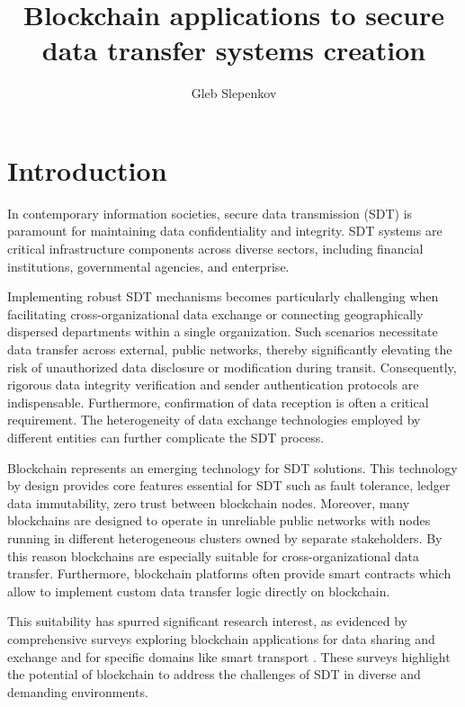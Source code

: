 \documentclass[10pt]{llncs}
\begin{document}
\title{Blockchain applications to secure data transfer systems creation}
\author{Gleb Slepenkov}

\maketitle

\section{Introduction}

In contemporary information societies, secure data transmission (SDT) is paramount for maintaining data confidentiality and integrity. 
SDT systems are critical infrastructure components across diverse sectors, including financial institutions, governmental agencies, and enterprise.

Implementing robust SDT mechanisms becomes particularly challenging when facilitating cross-organizational data exchange or connecting geographically dispersed departments within a single organization. 
Such scenarios necessitate data transfer across external, public networks, thereby significantly elevating the risk of unauthorized data disclosure or modification during transit. 
Consequently, rigorous data integrity verification and sender authentication protocols are indispensable. 
Furthermore, confirmation of data reception is often a critical requirement. 
The heterogeneity of data exchange technologies employed by different entities can further complicate the SDT process.

Blockchain represents an emerging technology for SDT solutions. 
This technology by design provides core features essential for SDT such as fault tolerance, ledger data immutability, zero trust between blockchain nodes.
Moreover, many blockchains are designed to operate in unreliable public networks with nodes running in different heterogeneous clusters owned by separate stakeholders.
By this reason blockchains are especially suitable for cross-organizational data transfer.
Furthermore, blockchain platforms often provide smart contracts which allow to implement custom data transfer logic directly on blockchain.

This suitability has spurred significant research interest, as evidenced by comprehensive surveys exploring blockchain applications for data sharing and exchange \cite{Song2023} and for specific domains like smart transport \cite{Bagga2022}.
These surveys highlight the potential of blockchain to address the challenges of SDT in diverse and demanding environments.
\end{document}
